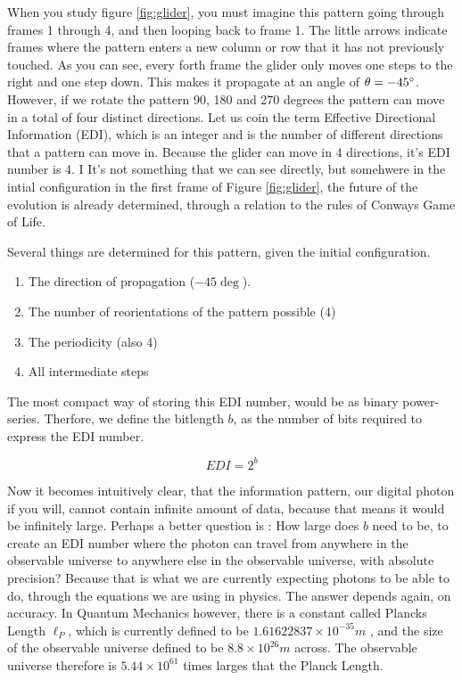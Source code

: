 \documentclass[notitlepage]{article}
\begin{document}
When you study figure  \ref{fig:glider}, you must imagine this pattern going through frames 1 through 4, and then looping back to frame 1. The little arrows indicate frames where the pattern enters a new column or row that it has not previously touched. As you can see, every forth frame the glider only moves one steps to the right and one step down. This makes it propagate at an angle of $\theta  = -45 \degree$. However, if we rotate the pattern 90, 180 and 270 degrees the pattern can move in a total of four distinct directions. Let us coin the term Effective Directional Information (EDI), which is an integer and is the number of different directions that a pattern can move in. Because the glider can move in 4 directions, it's EDI number is 4. I It's not something that we can see directly, but somehwere in the intial configuration in the first frame of Figure \ref{fig:glider}, the future of the evolution is already determined, through a relation to the rules of Conways Game of Life. 

Several things are determined for this pattern, given the initial configuration. 

\begin{enumerate}
\item The direction of propagation ($-45\deg$).
\item The number of reorientations of the pattern possible (4)
\item The periodicity (also 4)
\item All intermediate steps

\end{enumerate}
The most compact way of storing this EDI number, would be as binary power-series. Therfore, we define the bitlength $b$, as the number of bits required to express the EDI number.

\begin{equation}
\label{eq:EDI}
EDI =  2^b
\end{equation}




Now it becomes intuitively clear, that the information pattern, our digital photon if you will, cannot contain infinite amount of data, because that means it would be infinitely large. Perhaps a better question is : How large does $b$ need to be, to create an EDI number where the photon can travel from anywhere in the observable universe to anywhere else in the observable universe, with absolute precision? Because that is what we are currently expecting photons to be able to do, through the equations we are using in physics. The answer depends again, on accuracy. In Quantum Mechanics however, there is a constant called Plancks Length $\ell_P$, which is currently defined to be $1.61622837 \times 10^{-35} m $ , and the size of the observable universe defined to be $8.8\times10^{26} m$ across. The observable universe therefore is $5.44 \times 10^{61}$ times larges that the Planck Length. 
\end{document}
